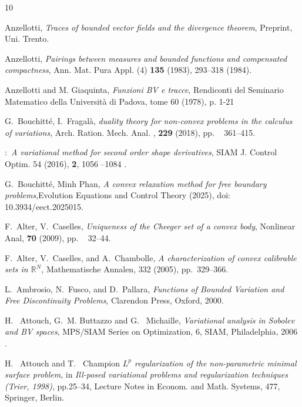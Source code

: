 \documentclass[reqno,11pt]{amsart}
\theoremstyle{definition}
\numberwithin{equation}{section}
\newcommand{\RR}{\mathbb{R}}
\newcommand{\1}{{{\bf 1}\kern-0,28em\rm l}}
\begin{document}
\begin{thebibliography}{10}


{ Anzellotti}, \emph{Traces of bounded vector fields and the divergence
  theorem}, Preprint, Uni. Trento.

{ Anzellotti}, \emph{Pairings between measures and bounded functions and
  compensated compactness}, Ann. Mat. Pura Appl. (4) \textbf{135} (1983),
  293--318 (1984).

{ Anzellotti and M. Giaquinta}, \emph{Funzioni BV e tracce},
 Rendiconti del Seminario Matematico della Universit\`a di Padova,
tome 60 (1978), p. 1-21


{\sc G.~Bouchitt\'e, I.~Fragal\`a}, {\em duality theory for non-convex problems in the calculus of
   variations}, Arch. Ration. Mech. Anal. , {\bf 229} (2018), pp. ~ 361--415. 
   
  
  :\ {\em A variational method for second order shape derivatives},
 SIAM J. Control Optim. 54 (2016), {\bf 2}, 1056 --1084 .

   
{\sc G.~Bouchitt\'e, Minh Phan}, {\em A convex relaxation method for free boundary problems},Evolution Equations and Control Theory  (2025),
doi: 10.3934/eect.2025015.
 
{\sc F.~Alter, V.~Caselles}, {\em Uniqueness of the Cheeger set of a convex body}, Nonlinear Anal, {\bf 70} (2009), pp. ~ 32--44. 
  
{\sc F.~Alter, V.~Caselles, and A.~Chambolle}, {\em A characterization of
  convex calibrable sets in {$\RR^N$}}, Mathematische Annalen, 332 (2005),
  pp.~329--366.

{\sc L.~Ambrosio, N.~Fusco, and D.~Pallara}, {\em Functions of Bounded
  Variation and Free Discontinuity Problems}, Clarendon Press, Oxford, 2000.
  
 {\sc   H. ~Attouch, G.~M. Buttazzo and G.~ Michaille}, {\em Variational analysis in Sobolev and BV spaces}, MPS/SIAM Series on Optimization, 6, SIAM, Philadelphia,  2006 .
 
  {\sc H.~ Attouch and T.~ Champion} {\em  $L^p$ regularization of the non-parametric minimal surface problem}, in {\em Ill-posed variational problems and regularization techniques (Trier, 1998)}, pp.25--34, Lecture Notes in Econom. and Math. Systems, 477, Springer, Berlin.


\end{thebibliography}
\end{document}
